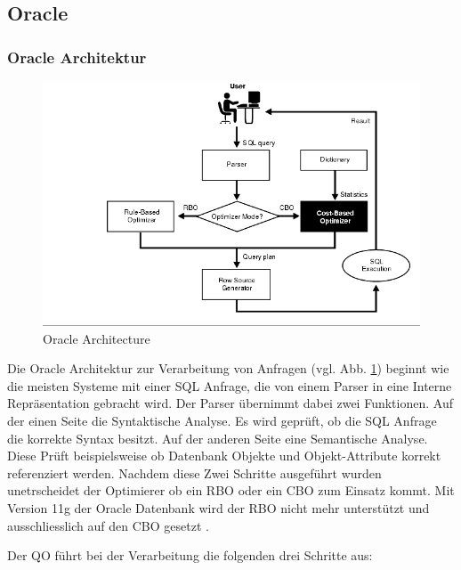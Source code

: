 \subsection{Oracle}
\subsubsection{Oracle Architektur}


\begin{figure}[h]
  \centering
  \includegraphics[width=\textwidth]{03_Related_Work/OracleArchitecture.png}
  \caption{Oracle Architecture \cite{Oracle2004Basics}}
  \label{OracleArchitecture}
\end{figure}



Die Oracle Architektur zur Verarbeitung von Anfragen \cite{Oracle2004Basics} (vgl. Abb. \ref{OracleArchitecture})  beginnt wie die meisten Systeme mit einer SQL Anfrage, die von einem Parser in eine Interne Repräsentation gebracht wird. Der Parser übernimmt dabei zwei Funktionen. Auf der einen Seite die Syntaktische Analyse. Es wird geprüft, ob die SQL Anfrage die korrekte Syntax besitzt. Auf der anderen Seite eine Semantische Analyse. Diese Prüft beispielsweise ob Datenbank Objekte und Objekt-Attribute  korrekt referenziert werden. Nachdem diese Zwei Schritte ausgeführt wurden unetrscheidet der Optimierer ob ein \ac{RBO} oder ein \ac{CBO} zum Einsatz kommt. Mit Version 11g der Oracle Datenbank wird der \ac{RBO} nicht mehr unterstützt und ausschliesslich auf den \ac{CBO} gesetzt \cite{dba_oracle2015}.

Der \ac{QO} führt bei der Verarbeitung die folgenden drei Schritte aus:

